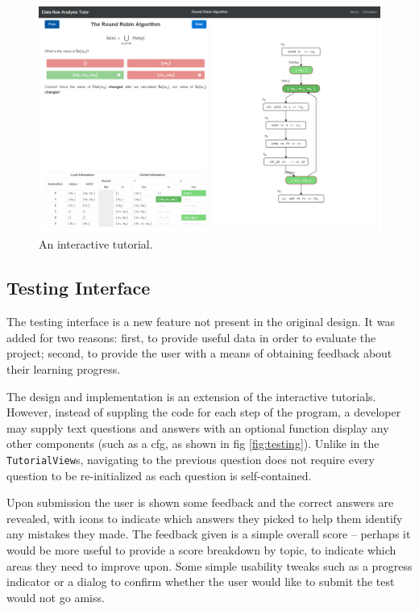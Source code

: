 \documentclass[bsc,twoside,singlespacing,parskip,logo,notimes,normalheadings]{infthesis}
\begin{document}
        \begin{figure}[p]
          \centering
          \includegraphics[width=\textheight, angle=-90]{img/lesson.png}
          \captionsetup{width=\textwidth, justification=centering}
          \caption{An interactive tutorial.}\label{fig:tutorial}
        \end{figure}

        \subsection{Testing Interface}\label{sec:impl-testing}

        The testing interface is a new feature not present in the
        original design. It was added for two reasons: first, to
        provide useful data in order to evaluate the project; second,
        to provide the user with a means of obtaining feedback about
        their learning progress.

        The design and implementation is an extension of the
        interactive tutorials. However, instead of suppling the code
        for each step of the program, a developer may supply text
        questions and answers with an optional function display any
        other components (such as a \gls{cfg}, as shown in fig
        \ref{fig:testing}). Unlike in the {\tt TutorialView}s,
        navigating to the previous question does not require every
        question to be re-initialized as each question is
        self-contained.

        Upon submission the user is shown some feedback and the
        correct answers are revealed, with icons to indicate which
        answers they picked to help them identify any mistakes they
        made. The feedback given is a simple overall score -- perhaps
        it would be more useful to provide a score breakdown by topic,
        to indicate which areas they need to improve upon. Some simple
        usability tweaks such as a progress indicator or a dialog to
        confirm whether the user would like to submit the test would
        not go amiss.
\end{document}
